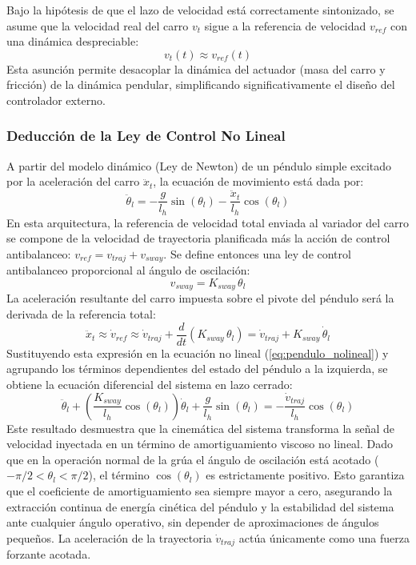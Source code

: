 \documentclass[11pt]{article}                                    %
\begin{document}
Bajo la hipótesis de que el lazo de velocidad está correctamente sintonizado, se asume que la velocidad real del carro $v_t$ sigue a la referencia de velocidad $v_{ref}$ con una dinámica despreciable:
\begin{equation}
    v_t(t) \approx v_{ref}(t)
\end{equation}
Esta asunción permite desacoplar la dinámica del actuador (masa del carro y fricción) de la dinámica pendular, simplificando significativamente el diseño del controlador externo.

\subsubsection{Deducción de la Ley de Control No Lineal}
A partir del modelo dinámico (Ley de Newton) de un péndulo simple excitado por la aceleración del carro $\ddot{x}_t$, la ecuación de movimiento está dada por:
\begin{equation}
    \ddot{\theta}_l = -\frac{g}{l_h}\sin(\theta_l) - \frac{\ddot{x}_t}{l_h}\cos(\theta_l)
    \label{eq:pendulo_nolineal}
\end{equation}
En esta arquitectura, la referencia de velocidad total enviada al variador del carro se compone de la velocidad de trayectoria planificada más la acción de control antibalanceo: $v_{ref} = v_{traj} + v_{sway}$. 
Se define entonces una ley de control antibalanceo proporcional al ángulo de oscilación:
\begin{equation}
    v_{sway} = K_{sway} \, \theta_l
    \label{eq:ley_control}
\end{equation}
La aceleración resultante del carro impuesta sobre el pivote del péndulo será la derivada de la referencia total:
\begin{equation}
    \ddot{x}_t \approx \dot{v}_{ref} \approx \dot{v}_{traj} + \frac{d}{dt}(K_{sway} \, \theta_l) = \dot{v}_{traj} + K_{sway} \, \dot{\theta}_l
\end{equation}
Sustituyendo esta expresión en la ecuación no lineal (\ref{eq:pendulo_nolineal}) y agrupando los términos dependientes del estado del péndulo a la izquierda, se obtiene la ecuación diferencial del sistema en lazo cerrado:
\begin{equation}
    \ddot{\theta}_l + \left( \frac{K_{sway}}{l_h} \cos(\theta_l) \right) \dot{\theta}_l + \frac{g}{l_h}\sin(\theta_l) = -\frac{\dot{v}_{traj}}{l_h}\cos(\theta_l)
    \label{eq:lazo_cerrado_nolineal}
\end{equation}
Este resultado desmuestra que la cinemática del sistema transforma la señal de velocidad inyectada en un término de amortiguamiento viscoso no lineal. Dado que en la operación normal de la grúa el ángulo de oscilación está acotado ($-\pi/2 < \theta_l < \pi/2$), el término $\cos(\theta_l)$ es estrictamente positivo. Esto garantiza que el coeficiente de amortiguamiento sea siempre mayor a cero, asegurando la extracción continua de energía cinética del péndulo y la estabilidad del sistema ante cualquier ángulo operativo, sin depender de aproximaciones de ángulos pequeños. La aceleración de la trayectoria $\dot{v}_{traj}$ actúa únicamente como una fuerza forzante acotada.
\end{document}
